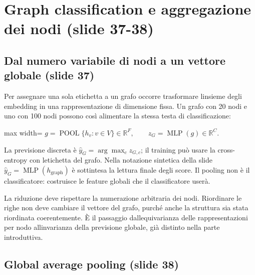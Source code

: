 \documentclass[11pt,a4paper,oneside,openany]{book}
\begin{document}
\section{Graph classification e aggregazione dei nodi (slide 37-38)}\label{f05-n30-r690}

\subsection{Dal numero variabile di nodi a un vettore globale (slide 37)}\label{f05-n30-r692}

Per assegnare una sola etichetta a un grafo occorre trasformare l\textquotesingle insieme degli embedding in una rappresentazione di dimensione fissa. Un grafo con 20 nodi e uno con 100 nodi possono così alimentare la stessa testa di classificazione:

\begin{center}
\begin{adjustbox}{max width=\linewidth}
$\displaystyle \boxed{g=\operatorname{POOL}\{h_v:v\in V\}\in\mathbb R^F,\qquad
z_G=\operatorname{MLP}(g)\in\mathbb R^C.}$
\end{adjustbox}
\end{center}

La previsione discreta è \(\widehat y_G=\arg\max_c z_{G,c}\); il training può usare la cross-entropy con l\textquotesingle etichetta del grafo. Nella notazione sintetica della slide \(\widehat y_G=\operatorname{MLP}(h_{\mathrm{graph}})\) è sottintesa la lettura finale degli score. Il pooling non è il classificatore: costruisce le feature globali che il classificatore userà.

La riduzione deve rispettare la numerazione arbitraria dei nodi. Riordinare le righe non deve cambiare il vettore del grafo, purché anche la struttura sia stata riordinata coerentemente. È il passaggio dall\textquotesingle equivarianza delle rappresentazioni per nodo all\textquotesingle invarianza della previsione globale, già distinto nella parte introduttiva.

\subsection{Global average pooling (slide 38)}\label{f05-n30-r703}
\end{document}
